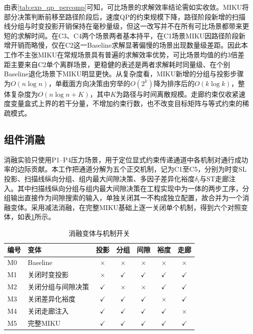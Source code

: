 \documentclass[a4paper,11pt]{ctexart}
\theoremstyle{definition}
\begin{document}
由表\ref{tab:exp_qp_percomp}可知，可比场景的求解效率结论需如实收敛。MIKU将部分决策判断前移至路径阶段后，速度QP的约束规模下降，路径阶段新增的扫描线分组与时变投影开销保持在毫秒量级，但这一改写并不在所有可比场景都带来更短的求解时间。在C3、C4两个场景两者基本持平，在C1场景MIKU因路径阶段新增开销而略慢，仅在C2这一Baseline求解显著偏慢的场景出现数量级差距。因此本工作不主张MIKU在常规场景具有普遍的求解效率优势，可比场景均值的约3倍差距主要来自C2单个离群场景，更稳健的表述是两者求解耗时同量级、在个别Baseline退化场景下MIKU明显更快。从复杂度看，MIKU新增的分组与投影步骤为$O(n \log n)$，单截面方向决策由穷举的$O(2^k)$降为排序后的$O(k \log k)$，整体复杂度为$O(n \log n + K)$，其中$K$为路径与时间离散规模。走廊约束仅收紧速度变量盒式上界的若干分量，不增加约束行数，也不改变目标矩阵与等式约束的稀疏模式。

\subsection{组件消融}
\label{subsec:exp_ablation}

消融实验只使用P1--P4压力场景，用于定位显式约束传递通道中各机制对通行成功率的边际贡献。本工作把通道分解为五个正交机制，记为C1至C5，分别为时变SL投影、扫描线纵向分组、组内最大间隙决策、多因子差异化裕度$\delta_i$与ST走廊注入。其中扫描线纵向分组与组内最大间隙决策在工程实现中为一体的两步工序，分组输出直接作为间隙搜索的输入，单独关闭其一不构成独立配置，故合并为一个消融变体。采用减法消融，在完整MIKU基础上逐一关闭单个机制，得到六个对照变体，如表\ref{tab:exp_ablation_matrix}所示。

\begin{table}[htbp]
\centering
\caption{消融变体与机制开关}
\label{tab:exp_ablation_matrix}
\small
\begin{tabular}{llccccc}
\toprule
\textbf{编号} & \textbf{变体} & 投影 & 分组 & 间隙 & 裕度 & 走廊 \\
\midrule
M0 & Baseline             & $\times$    & $\times$    & $\times$    & $\times$    & $\times$    \\
M1 & 关闭时变投影         & $\times$    & $\checkmark$ & $\checkmark$ & $\checkmark$ & $\checkmark$ \\
M2 & 关闭分组与间隙决策   & $\checkmark$ & $\times$    & $\times$    & $\checkmark$ & $\checkmark$ \\
M3 & 关闭差异化裕度       & $\checkmark$ & $\checkmark$ & $\checkmark$ & $\times$    & $\checkmark$ \\
M4 & 关闭走廊注入         & $\checkmark$ & $\checkmark$ & $\checkmark$ & $\checkmark$ & $\times$    \\
M5 & 完整MIKU             & $\checkmark$ & $\checkmark$ & $\checkmark$ & $\checkmark$ & $\checkmark$ \\
\bottomrule
\end{tabular}
\end{table}
\end{document}
